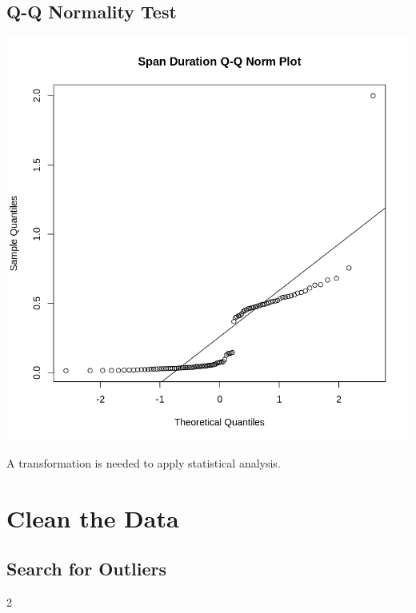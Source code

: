 \documentclass[
  letterpaper,
  DIV=11,
  numbers=noendperiod]{scrartcl}
\begin{document}
\hypertarget{q-q-normality-test}{%
\subsection{Q-Q Normality Test}\label{q-q-normality-test}}

\includegraphics{dss-span-analysis-rev1_files/figure-pdf/cell-14-output-1.png}

A transformation is needed to apply statistical analysis.

\hypertarget{clean-the-data}{%
\section{Clean the Data}\label{clean-the-data}}

\hypertarget{search-for-outliers}{%
\subsection{Search for Outliers}\label{search-for-outliers}}

2
\end{document}
